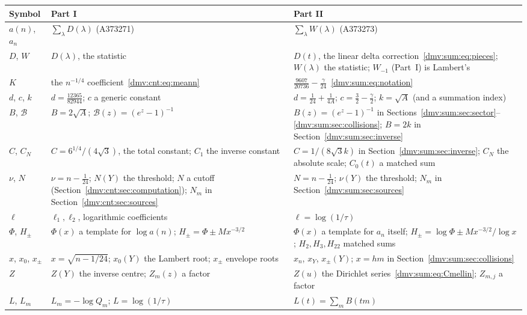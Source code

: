 \documentclass[11pt,letterpaper]{article}
\numberwithin{equation}{section}
\theoremstyle{definition}\newtheorem{definition}[theorem]{Definition}
\theoremstyle{remark}\newtheorem{remark}[theorem]{Remark}
\begin{document}
\renewcommand{\arraystretch}{1.1}
\renewcommand{\theHtable}{dmvguide.\arabic{table}}%
\begin{longtable}{@{}>{\raggedright\arraybackslash}p{0.75in}>{\raggedright\arraybackslash}p{2.55in}>{\raggedright\arraybackslash}p{2.55in}@{}}
\toprule
Symbol & Part I & Part II\\
\midrule
\endhead
$a(n)$, $a_n$ & $\sum_\lambda D(\lambda)$ (A373271) & $\sum_\lambda W(\lambda)$ (A373273)\\
$D$, $W$ & $D(\lambda)$, the statistic & $D(t)$, the linear delta correction~\eqref{dmv:sum:eq:pieces}; $W(\lambda)$ the statistic; $W_{-1}$ (Part~I) is Lambert's\\
$K$ & the $n^{-1/4}$ coefficient~\eqref{dmv:cnt:eq:meann} & $\tfrac{9607}{20736}-\tfrac\gamma{24}$~\eqref{dmv:sum:eq:notation}\\
$d$, $c$, $k$ & $d=\tfrac{12365}{82944}$; $c$ a generic constant & $d=\tfrac1{24}+\tfrac1{4A}$; $c=\tfrac32-\tfrac\gamma2$; $k=\sqrt A$ (and a summation index)\\
$B$, $\mathcal B$ & $B=2\sqrt A$; $\mathcal B(z)=(e^z-1)^{-1}$ & $B(z)=(e^z-1)^{-1}$ in Sections~\ref{dmv:sum:sec:sector}--\ref{dmv:sum:sec:collisions}; $B=2k$ in Section~\ref{dmv:sum:sec:inverse}\\
$C$, $C_N$ & $C=6^{1/4}/(4\sqrt3)$, the total constant; $C_1$ the inverse constant & $C=1/(8\sqrt3k)$ in Section~\ref{dmv:sum:sec:inverse}; $C_N$ the absolute scale; $C_0(t)$ a matched sum\\
$\nu$, $N$ & $\nu=n-\tfrac1{24}$; $N(Y)$ the threshold; $N$ a cutoff (Section~\ref{dmv:cnt:sec:computation}); $N_m$ in Section~\ref{dmv:cnt:sec:sources} & $N=n-\tfrac1{24}$; $\nu(Y)$ the threshold; $N_m$ in Section~\ref{dmv:sum:sec:sources}\\
$\ell$ & $\ell_1,\ell_2$, logarithmic coefficients & $\ell=\log(1/\tau)$\\
$\Phi$, $H_\pm$ & $\Phi(x)$ a template for $\log a(n)$; $H_\pm=\Phi\pm Mx^{-3/2}$ & $\Phi(x)$ a template for $a_n$ itself; $H_\pm=\log\Phi\pm Mx^{-3/2}/\log x$; $H_2,H_3,H_{22}$ matched sums\\
$x$, $x_0$, $x_\pm$ & $x=\sqrt{n-1/24}$; $x_0(Y)$ the Lambert root; $x_\pm$ envelope roots & $x_n$, $x_Y$, $x_\pm(Y)$; $x=hm$ in Section~\ref{dmv:sum:sec:collisions}\\
$Z$ & $Z(Y)$ the inverse centre; $Z_m(z)$ a factor & $Z(u)$ the Dirichlet series~\eqref{dmv:sum:eq:Cmellin}; $Z_{m,j}$ a factor\\
$L$, $L_m$ & $L_m=-\log Q_m$; $L=\log(1/\tau)$ & $L(t)=\sum_mB(tm)$\\

\end{longtable}
\end{document}
